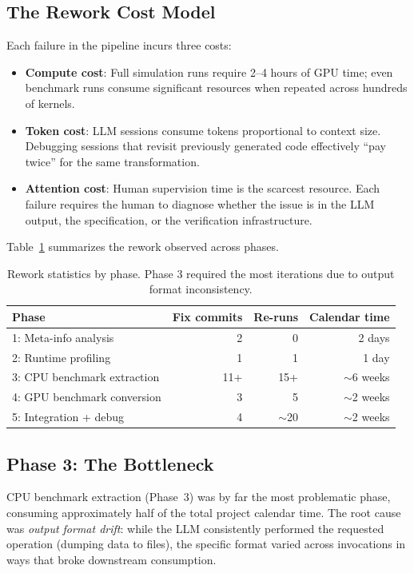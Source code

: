 \documentclass[conference]{IEEEtran}
\begin{document}
\subsection{The Rework Cost Model}

Each failure in the pipeline incurs three costs:

\begin{itemize}
\item \textbf{Compute cost}: Full simulation runs require 2--4 hours of GPU
  time; even benchmark runs consume significant resources when repeated
  across hundreds of kernels.
\item \textbf{Token cost}: LLM sessions consume tokens proportional to context
  size. Debugging sessions that revisit previously generated code effectively
  ``pay twice'' for the same transformation.
\item \textbf{Attention cost}: Human supervision time is the scarcest
  resource. Each failure requires the human to diagnose whether the issue is
  in the LLM output, the specification, or the verification infrastructure.
\end{itemize}

Table~\ref{tab:rework} summarizes the rework observed across phases.

\begin{table}[t]
\centering
\caption{Rework statistics by phase. Phase 3 required the most iterations
  due to output format inconsistency.}
\label{tab:rework}
\begin{tabular}{lrrr}
\toprule
Phase & Fix commits & Re-runs & Calendar time \\
\midrule
1: Meta-info analysis & 2 & 0 & 2 days \\
2: Runtime profiling & 1 & 1 & 1 day \\
3: CPU benchmark extraction & 11+ & 15+ & $\sim$6 weeks \\
4: GPU benchmark conversion & 3 & 5 & $\sim$2 weeks \\
5: Integration + debug & 4 & $\sim$20 & $\sim$2 weeks \\
\bottomrule
\end{tabular}
\end{table}

\subsection{Phase 3: The Bottleneck}

CPU benchmark extraction (Phase~3) was by far the most problematic phase,
consuming approximately half of the total project calendar time. The root
cause was \emph{output format drift}: while the LLM consistently performed
the requested operation (dumping data to files), the specific format varied
across invocations in ways that broke downstream consumption.
\end{document}

